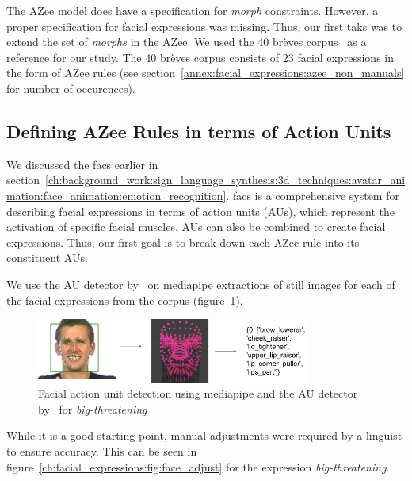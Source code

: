 \documentclass[../../main]{subfiles}
\begin{document}
The AZee model does have a specification for \emph{morph} constraints. However, a proper specification for facial expressions was missing. Thus, our first taks was to extend the set of \emph{morphs} in the AZee. We used the 40 brèves corpus~\cite{challant2024extending, challant2022first} as a reference for our study. The 40 brèves corpus consists of 23 facial expressions in the form of AZee rules (see section~\ref{annex:facial_expressions:azee_non_manuals} for number of occurences).

\subsection{Defining AZee Rules in terms of Action Units}
\label{ch:facial_expressions:defining_azee_rules_in_terms_of_action_units}

We discussed the \gls{facs} earlier in section~\ref{ch:background_work:sign_language_synthesis:3d_techniques:avatar_animation:face_animation:emotion_recognition}. \gls{facs} is a comprehensive system for describing facial expressions in terms of action units (AUs), which represent the activation of specific facial muscles. AUs can also be combined to create facial expressions. Thus, our first goal is to break down each AZee rule into its constituent AUs. 

We use the AU detector by~\cite{luo2022learning} on mediapipe extractions of still images for each of the facial expressions from the corpus (figure~\ref{ch:facial_expressions:fig:face_detect}).

\begin{figure}[h]
    \centering
    \includegraphics[width=0.8\textwidth]{chapters/facial_expressions/images/face_detect.png}
    \caption{Facial action unit detection using mediapipe and the AU detector by~\cite{luo2022learning} for \emph{big-threatening}}
    \label{ch:facial_expressions:fig:face_detect}
\end{figure}

While it is a good starting point, manual adjustments were required by a linguist to ensure accuracy. This can be seen in figure~\ref{ch:facial_expressions:fig:face_adjust} for the expression \emph{big-threatening}.
\end{document}
